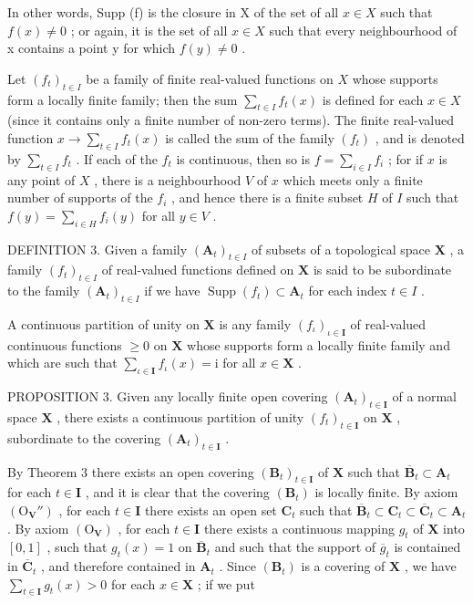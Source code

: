 In other words, Supp (f) is the closure in X of the set of all \(x \in X\) such that \(f(x) \neq 0\) ; or again, it is the set of all \(x \in X\) such that every neighbourhood of x contains a point y for which \(f(y) \neq 0\) .

Let \((f_{t})_{t\in I}\) be a family of finite real-valued functions on \(X\) whose supports form a locally finite family; then the sum \(\sum_{t\in I}f_t(x)\) is defined for each \(x\in X\) (since it contains only a finite number of non-zero terms). The finite real-valued function \(x\to \sum_{t\in I}f_t(x)\) is called the sum of the family \((f_{t})\) , and is denoted by \(\sum_{t\in I}f_{t}\) . If each of the \(f_{t}\) is continuous, then so is \(f = \sum_{i \in I} f_i\) ; for if \(x\) is any point of \(X\) , there is a neighbourhood \(V\) of \(x\) which meets only a finite number of supports of the \(f_i\) , and hence there is a finite subset \(H\) of \(I\) such that \(f(y) = \sum_{i \in H} f_i(y)\) for all \(y \in V\) .

DEFINITION 3. Given a family \((\mathbf{A}_{t})_{t\in I}\) of subsets of a topological space \(\mathbf{X}\) , a family \((f_t)_{t\in I}\) of real-valued functions defined on \(\mathbf{X}\) is said to be subordinate to the family \((\mathbf{A}_t)_{t\in I}\) if we have \(\operatorname{Supp}(f_t)\subset \mathbf{A}_t\) for each index \(t\in I\) .

A continuous partition of unity on \(\mathbf{X}\) is any family \((f_{\iota})_{\iota \in \mathbf{I}}\) of real-valued continuous functions \(\geqslant 0\) on \(\mathbf{X}\) whose supports form a locally finite family and which are such that \(\sum_{\iota \in \mathbf{I}} f_{\iota}(x) = \mathrm{i}\) for all \(x \in \mathbf{X}\) .

PROPOSITION 3. Given any locally finite open covering \((\mathbf{A}_t)_{t \in \mathbf{I}}\) of a normal space \(\mathbf{X}\) , there exists a continuous partition of unity \((f_t)_{t \in \mathbf{I}}\) on \(\mathbf{X}\) , subordinate to the covering \((\mathbf{A}_t)_{t \in \mathbf{I}}\) .

By Theorem 3 there exists an open covering \((\mathbf{B}_t)_{t \in \mathbf{I}}\) of \(\mathbf{X}\) such that \(\overline{\mathbf{B}}_t \subset \mathbf{A}_t\) for each \(t \in \mathbf{I}\) , and it is clear that the covering \((\mathbf{B}_t)\) is locally finite. By axiom \((\mathrm{O}_{\mathbf{V}}'')\) , for each \(t \in \mathbf{I}\) there exists an open set \(\mathbf{C}_t\) such that \(\overline{\mathbf{B}}_t \subset \mathbf{C}_t \subset \overline{\mathbf{C}}_t \subset \mathbf{A}_t\) . By axiom \((\mathrm{O}_{\mathbf{V}})\) , for each \(t \in \mathbf{I}\) there exists a continuous mapping \(g_t\) of \(\mathbf{X}\) into \([0,1]\) , such that \(g_t(x) = 1\) on \(\overline{\mathbf{B}}_t\) and such that the support of \(\overline{g}_t\) is contained in \(\overline{\mathbf{C}}_t\) , and therefore contained in \(\mathbf{A}_t\) . Since \((\mathbf{B}_t)\) is a covering of \(\mathbf{X}\) , we have \(\sum_{t \in \mathbf{I}} g_t(x) > 0\) for each \(x \in \mathbf{X}\) ; if we put

